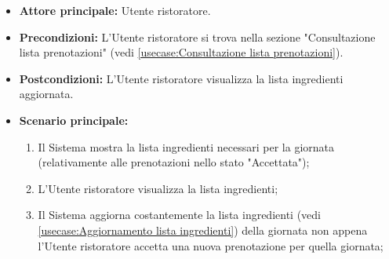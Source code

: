 \label{usecase:Consultazione lista ingredienti}
\begin{itemize}

	\item \textbf{Attore principale:} Utente ristoratore.

	\item \textbf{Precondizioni:} L'Utente ristoratore si trova nella sezione "Consultazione lista prenotazioni" (vedi \autoref{usecase:Consultazione lista prenotazioni}).

	\item \textbf{Postcondizioni:} L'Utente ristoratore visualizza la lista ingredienti aggiornata.

	\item \textbf{Scenario principale:}
	\begin{enumerate}
		\item Il Sistema mostra la lista ingredienti necessari per la giornata (relativamente alle prenotazioni nello stato "Accettata");
		\item L'Utente ristoratore visualizza la lista ingredienti;
		\item Il Sistema aggiorna costantemente la lista ingredienti (vedi \autoref{usecase:Aggiornamento lista ingredienti}) della giornata non appena l'Utente ristoratore accetta una nuova prenotazione per quella giornata;
	\end{enumerate}

\end{itemize}
